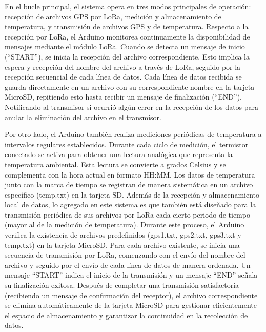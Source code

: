 \begin{itemize}
	En el bucle principal, el sistema opera en tres modos principales de operación: recepción de archivos GPS por LoRa, medición y almacenamiento de temperatura, y transmisión de archivos GPS y de temperatura. Respecto a la recepción por LoRa, el Arduino monitorea continuamente la disponibilidad de mensajes mediante el módulo LoRa. Cuando se detecta un mensaje de inicio (“START''), se inicia la recepción del archivo correspondiente. Esto implica la espera y recepción del nombre del archivo a través de LoRa, seguido por la recepción secuencial de cada línea de datos. Cada línea de datos recibida se guarda directamente en un archivo con su correspondiente nombre en la tarjeta MicroSD, repitiendo esto hasta recibir un mensaje de finalización (“END''). Notificando al transmisor si ocurrió algún error en la recepción de los datos para anular la eliminación del archivo en el transmisor. 
	
	Por otro lado, el Arduino también realiza mediciones periódicas de temperatura a intervalos regulares establecidos. Durante cada ciclo de medición, el termistor conectado se activa para obtener una lectura analógica que representa la temperatura ambiental. Esta lectura se convierte a grados Celsius y se complementa con la hora actual en formato HH:MM. Los datos de temperatura junto con la marca de tiempo se registran de manera sistemática en un archivo específico (temp.txt) en la tarjeta SD.
	Además de la recepción y almacenamiento local de datos, lo agregado en este sistema es que también está diseñado para la transmisión periódica de sus archivos por LoRa cada cierto periodo de tiempo (mayor al de la medición de temperatura). Durante este proceso, el Arduino verifica la existencia de archivos predefinidos (gps1.txt, gps2.txt, gps3.txt y temp.txt) en la tarjeta MicroSD. Para cada archivo existente, se inicia una secuencia de transmisión por LoRa, comenzando con el envío del nombre del archivo y seguido por el envío de cada línea de datos de manera ordenada. Un mensaje “START'' indica el inicio de la transmisión y un mensaje “END'' señala su finalización exitosa. Después de completar una transmisión satisfactoria (recibiendo un mensaje de confirmación del receptor), el archivo correspondiente se elimina automáticamente de la tarjeta MicroSD para gestionar eficientemente el espacio de almacenamiento y garantizar la continuidad en la recolección de datos.
	

\end{itemize}
